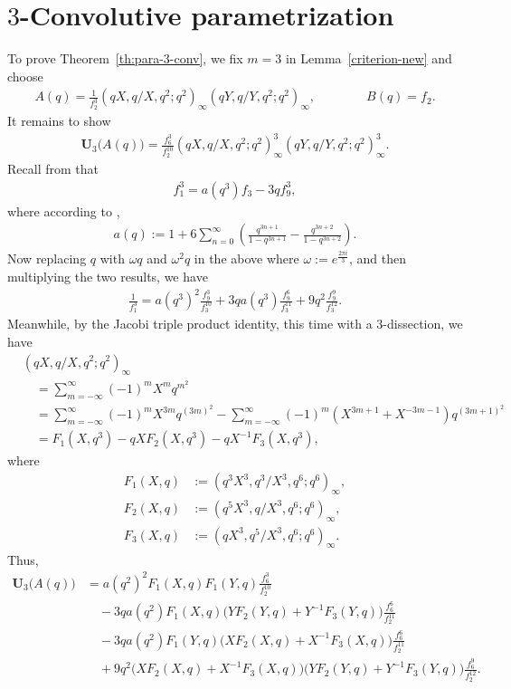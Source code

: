 \documentclass[12pt,reqno]{amsart}
\numberwithin{equation}{section}
\theoremstyle{plain}
\theoremstyle{definition}
\theoremstyle{named}
\newcommand{\UU}{\mathbf{U}}
\begin{document}
\section{$3$-Convolutive parametrization}\label{sec:para-3}
To prove Theorem~\ref{th:para-3-conv}, we fix $m=3$ in Lemma~\ref{criterion-new} and choose
\begin{align*}
	A(q) = \frac{1}{f_2^3} (qX,q/X,q^2;q^2)_\infty (qY,q/Y,q^2;q^2)_\infty, \qquad\qquad B(q) = f_2.
\end{align*}
It remains to show
\begin{align*}
	\UU_3\big(A(q)\big) = \frac{f_6^3}{f_2^{10}} (qX,q/X,q^2;q^2)_\infty^3 (qY,q/Y,q^2;q^2)_\infty^3.
\end{align*}
Recall from \cite[p.~184, eq.~(21.3.7)]{Hir} that
\begin{align*}
	f_1^3=a(q^3)f_3-3qf_9^3,
\end{align*}
where according to \cite[p.~179, eqs.~(21.1.1) and (21.1.2)]{Hir},
\begin{align*}
	a(q) := 1+6\sum_{n=0}^\infty \left(\frac{q^{3n+1}}{1-q^{3n+1}}-\frac{q^{3n+2}}{1-q^{3n+2}}\right).
\end{align*}
Now replacing $q$ with $\omega q$ and $\omega^2 q$ in the above where $\omega:= e^{\frac{2\pi i}{3}}$, and then multiplying the two results, we have
\begin{align*}
	\frac{1}{f_1^3}=a(q^3)^2\frac{f_9^3}{f_3^{10}}+3qa(q^3)\frac{f_9^6}{f_3^{11}}
	+9q^2\frac{f_9^9}{f_3^{12}}.
\end{align*} 
Meanwhile, by the Jacobi triple product identity, this time with a $3$-dissection, we have
\begin{align*}
	&(qX,q/X,q^2;q^2)_\infty\\
	&\quad= \sum_{m=-\infty}^\infty (-1)^m X^m q^{m^2}\\
	&\quad= \sum_{m=-\infty}^\infty (-1)^m X^{3m} q^{(3m)^2} - \sum_{m=-\infty}^\infty (-1)^m (X^{3m+1}+X^{-3m-1}) q^{(3m+1)^2}\\
	&\quad= F_1(X,q^3) - qXF_2(X,q^3) - qX^{-1}F_3(X,q^3),
\end{align*}
where
\begin{align*}
	F_1(X,q) &:= (q^3X^3, q^3/X^3, q^{6};q^{6})_\infty,\\
	F_2(X,q) &:= (q^{5}X^3,q/X^3,q^{6};q^{6})_\infty,\\
	F_3(X,q) &:= (qX^3,q^{5}/X^3,q^{6};q^{6})_\infty.
\end{align*}
Thus,
\begin{align*}
	\UU_3\big(A(q)\big) &= a(q^2)^2F_1(X,q)F_1(Y,q)\frac{f_6^3}{f_2^{10}}\\
	&\quad - 3qa(q^2)F_1(X,q)\big(YF_2(Y,q)+Y^{-1}F_3(Y,q)\big)\frac{f_6^6}{f_2^{11}}\\
	&\quad - 3qa(q^2)F_1(Y,q)\big(XF_2(X,q)+X^{-1}F_3(X,q)\big)\frac{f_6^6}{f_2^{11}}\\
	&\quad + 9q^2 \big(XF_2(X,q)+X^{-1}F_3(X,q)\big)\big(YF_2(Y,q)+Y^{-1}F_3(Y,q)\big)\frac{f_6^9}{f_2^{12}}.
\end{align*}
\end{document}
